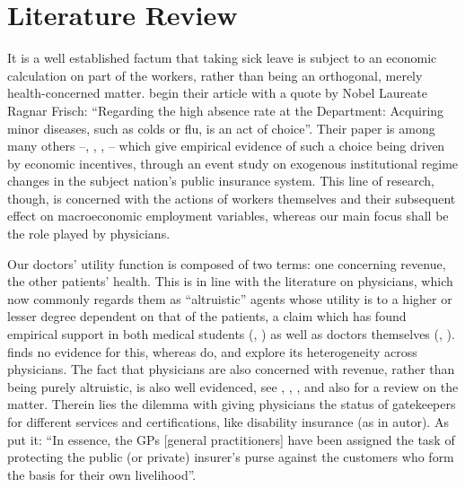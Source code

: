 \documentclass[../main.tex]{subfiles}
\begin{document}
\section{Literature Review}


It is a well established factum that taking sick leave is subject to an economic calculation on part of the workers, rather than being an orthogonal, merely health-concerned matter. \cite{JohanssonPalme} begin their article with a quote by Nobel Laureate Ragnar Frisch: ``Regarding the high absence rate at the Department: Acquiring minor diseases, such as colds or flu, is an act of choice''. Their paper is among many others --\cite{italian-jobs}, \cite{norway-jobs}, \cite{us-jobs}, \cite{sweden-jobs}-- which give empirical evidence of such a choice being driven by economic incentives, through an event study on exogenous institutional regime changes in the subject nation's public insurance system. This line of research, though, is concerned with the actions of workers themselves and their subsequent effect on macroeconomic employment variables, whereas our main focus shall be the role played by physicians.

Our doctors' utility function is composed of two terms: one concerning revenue, the other patients' health. This is in line with the literature on physicians, which now commonly regards them as ``altruistic'' agents whose utility is to a higher or lesser degree dependent on that of the patients, a claim which has found empirical support in both medical students (\cite{avengers}, \cite{hs-wiesen}) as well as doctors themselves (\cite{hippocrates}, \cite{brosigkoch}). \cite{crea2019physician} finds no evidence for this, whereas \cite{godager2013profit} do, and explore its heterogeneity across physicians. The fact that physicians are also concerned with revenue, rather than being purely altruistic, is also well evidenced, see \cite{clemensgottlieb}, \cite{HSW}, \cite{autor}, and also \cite{rrk2012} for a review on the matter. Therein lies the dilemma with giving physicians the status of gatekeepers for different services and certifications, like disability insurance (as in autor). As \citet[p.~1]{markussen-roed} put it: ``In essence, the GPs [general practitioners] have been assigned the task of protecting the public (or private) insurer's purse against the customers who form the basis for their own livelihood''.
\end{document}
